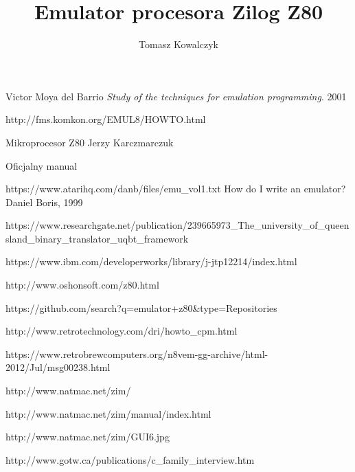 \documentclass[12pt]{report}
\author{Tomasz Kowalczyk}
\title{Emulator procesora Zilog Z80}
\begin{document}
	\maketitle
	\tableofcontents
	
	
	
	
	
		
		
	
	
	
	
	
	
	
	\begin{thebibliography}{9}
		Victor Moya del Barrio
		\emph{Study of the techniques for emulation programming}.
		2001
		
		http://fms.komkon.org/EMUL8/HOWTO.html
		
		Mikroprocesor Z80 Jerzy Karczmarczuk
		
		Oficjalny manual
		
		 https://www.atarihq.com/danb/files/emu\_vol1.txt
		How do I write an emulator? Daniel Boris, 1999
		
		https://www.researchgate.net/publication/239665973\_The\_university\_of\_queensland\_binary\_translator\_uqbt\_framework
		
		https://www.ibm.com/developerworks/library/j-jtp12214/index.html
		
		http://www.oshonsoft.com/z80.html
		
		https://github.com/search?q=emulator+z80\&type=Repositories
		
		http://www.retrotechnology.com/dri/howto\_cpm.html
		
		https://www.retrobrewcomputers.org/n8vem-gg-archive/html-2012/Jul/msg00238.html

		http://www.natmac.net/zim/
		
		http://www.natmac.net/zim/manual/index.html
		
		http://www.natmac.net/zim/GUI6.jpg
		
		http://www.gotw.ca/publications/c\_family\_interview.htm
			
	\end{thebibliography}
	
\end{document}

